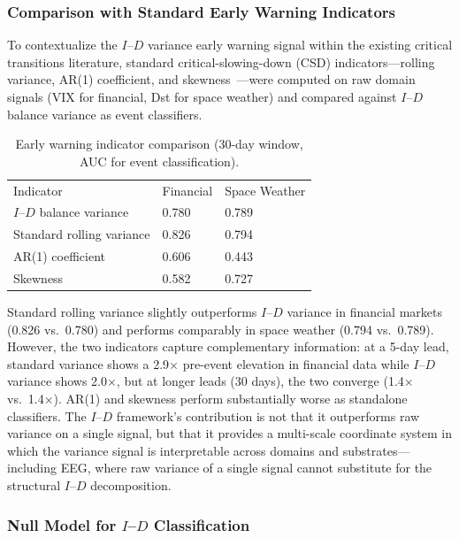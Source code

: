 \documentclass[aip,cha,reprint,amsmath,amssymb,final]{revtex4-2}
\begin{document}
\subsubsection{Comparison with Standard Early Warning Indicators}

To contextualize the $I$--$D$ variance early warning signal within the existing critical transitions literature, standard critical-slowing-down (CSD) indicators---rolling variance, AR(1) coefficient, and skewness~\cite{dakos2012}---were computed on raw domain signals (VIX for financial, Dst for space weather) and compared against $I$--$D$ balance variance as event classifiers.

\begin{table}[!htbp]
\caption[Early warning indicator comparison showing AUC for event classification across methods]{\label{tab:ews}Early warning indicator comparison (30-day window, AUC for event classification).}
\begin{ruledtabular}
\begin{tabular}{lll}
Indicator & Financial & Space Weather \\
$I$--$D$ balance variance & 0.780 & 0.789 \\
Standard rolling variance & 0.826 & 0.794 \\
AR(1) coefficient & 0.606 & 0.443 \\
Skewness & 0.582 & 0.727 \\
\end{tabular}
\end{ruledtabular}
\end{table}

Standard rolling variance slightly outperforms $I$--$D$ variance in financial markets (0.826 vs.\ 0.780) and performs comparably in space weather (0.794 vs.\ 0.789). However, the two indicators capture complementary information: at a 5-day lead, standard variance shows a 2.9$\times$ pre-event elevation in financial data while $I$--$D$ variance shows 2.0$\times$, but at longer leads (30 days), the two converge (1.4$\times$ vs.\ 1.4$\times$). AR(1) and skewness perform substantially worse as standalone classifiers. The $I$--$D$ framework's contribution is not that it outperforms raw variance on a single signal, but that it provides a multi-scale coordinate system in which the variance signal is interpretable across domains and substrates---including EEG, where raw variance of a single signal cannot substitute for the structural $I$--$D$ decomposition.

\subsubsection{Null Model for $I$--$D$ Classification}
\end{document}
